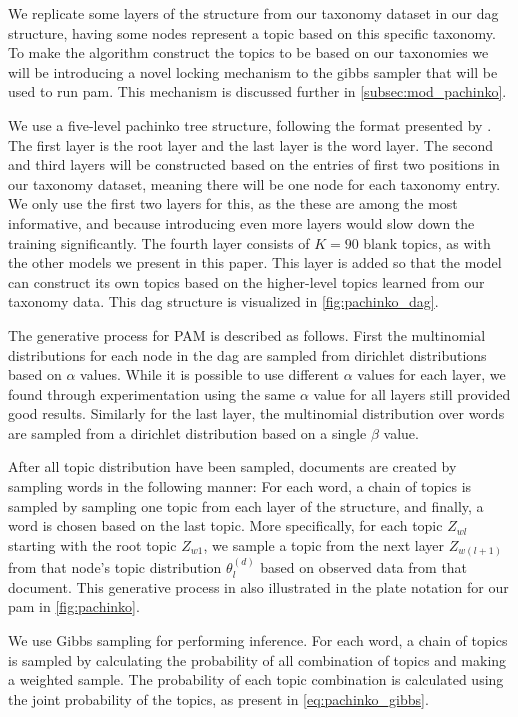 We replicate some layers of the structure from our taxonomy dataset in our \gls{dag} structure, having some nodes represent a topic based on this specific taxonomy.
To make the algorithm construct the topics to be based on our taxonomies we will be introducing a novel locking mechanism to the gibbs sampler that will be used to run \gls{pam}.
This mechanism is discussed further in \autoref{subsec:mod_pachinko}.

We use a five-level pachinko tree structure, following the format presented by \cite{li2006pachinko}.
The first layer is the root layer and the last layer is the word layer.
The second and third layers will be constructed based on the entries of first two positions in our taxonomy dataset, meaning there will be one node for each taxonomy entry.
We only use the first two layers for this, as the these are among the most informative, and because introducing even more layers would slow down the training significantly.
The fourth layer consists of $K = 90$ blank topics, as with the other models we present in this paper.
This layer is added so that the model can construct its own topics based on the higher-level topics learned from our taxonomy data.
This \gls{dag} structure is visualized in \autoref{fig:pachinko_dag}.


The generative process for PAM is described as follows.
First the multinomial distributions for each node in the \gls{dag} are sampled from dirichlet distributions based on $\alpha$ values.
While it is possible to use different $\alpha$ values for each layer, we found through experimentation using the same $\alpha$ value for all layers still provided good results.
Similarly for the last layer, the multinomial distribution over words are sampled from a dirichlet distribution based on a single $\beta$ value.

After all topic distribution have been sampled, documents are created by sampling words in the following manner:
For each word, a chain of topics is sampled by sampling one topic from each layer of the structure, and finally, a word is chosen based on the last topic.
More specifically, for each topic $Z_{wl}$ starting with the root topic $Z_{w1}$, we sample a topic from the next layer $Z_{w(l+1)}$ from that node's topic distribution $\theta_l^{(d)}$ based on observed data from that document.
This generative process in also illustrated in the plate notation for our \gls{pam} in \autoref{fig:pachinko}.


We use Gibbs sampling for performing inference.
For each word, a chain of topics is sampled by calculating the probability of all combination of topics and making a weighted sample.
The probability of each topic combination is calculated using the joint probability of the topics, as present in \autoref{eq:pachinko_gibbs}.

